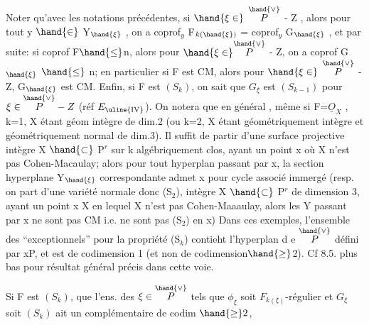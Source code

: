 
Noter qu'avec les notations précédentes, si $\hand{\xi\in}$ $\overset{\hand{\vee}}{P}$ - Z , alors pour tout
y $\hand{\in}$ Y$_{\hand{\xi}}$ , on a coprof$_y$ F$_{k(\hand{\xi})}$ = coprof$_y$ G$_{\hand{\xi}}$ , et par suite: si coprof F$\hand{\leq}$n,
alors pour $\hand{\xi\in}\overset{\hand{\vee}}{P}$ - Z, on a coprof G$_{\hand{\xi}}$ $\hand{\leq}$ n; en particulier si F est CM, alors
pour $\hand{\xi\in}$ $\overset{\hand{\vee}}{P}$ - Z, G$_{\hand{\xi}}$ est CM. Enfin, si F est $(S_k)$, on sait que $G_\xi$ est $(S_{k-1})$ pour $\xi\in\overset{\hand{\vee}}{P}-Z$ (réf $E_{\uline{\mathrm{IV}}}$).
 On notera que   en général
, même si F=$\underline{O}_X$ , k=1, X étant géom intègre de dim.2 (ou k=2, X étant
géométriquement intègre et géométriquement normal de dim.3). Il suffit
de partir d'une surface projective  intègre X $\hand{\subset}$ P$^r$ sur k algébriquement
clos, ayant un point x où X n'est pas Cohen-Macaulay; alors pour tout
hyperplan passant par x, la section hyperplane Y$_{\hand{\xi}}$ correspondante admet
x pour cycle associé immergé (resp. on part d'une variété normale\hand{,} \hand{(}donc
(S$_2$)\hand{)}, intègre X $\hand{\subset}$ P$^r$ de dimension 3, ayant un point x \hand{$\in$} X en lequel X n'est pas
Cohen-Maaaulay, alors les Y passant par x ne sont pas  CM i.e. ne sont
pas (S$_2$) en x) Dans ces exemples, l'ensemble des \hand{$\xi$} ``exceptionnels''
pour la propriété (S$_k$) contieht l'hyperplan d e $\overset{\hand{\vee}}{P}$ défini par x\hand{$\in$}P, et est
de codimension 1 (et non de codimension$\hand{\geq}$2). Cf  8.5. plus bas pour  résultat général précis dans cette voie.



Si F est $(S_k)$, que l'ens. des $\xi\in\overset{\hand{\vee}}{P}$ tels que $\phi_\xi$ soit $F_{k(\xi)}$-régulier et $G_\xi$ soit $(S_k)$ ait un complémentaire de codim $\hand{\geq} 2$,

